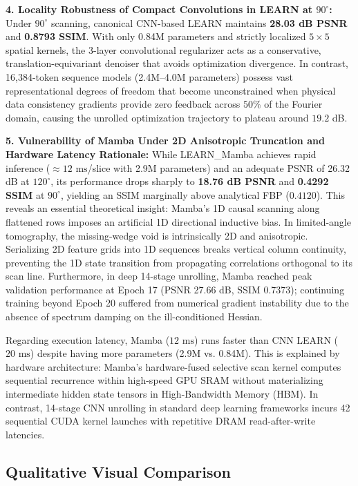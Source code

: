 \documentclass[runningheads]{llncs}
\begin{document}
\noindent \textbf{4. Locality Robustness of Compact Convolutions in LEARN at $90^\circ$:}
Under $90^\circ$ scanning, canonical CNN-based LEARN maintains \textbf{28.03 dB PSNR} and \textbf{0.8793 SSIM}. With only 0.84M parameters and strictly localized $5 \times 5$ spatial kernels, the 3-layer convolutional regularizer acts as a conservative, translation-equivariant denoiser that avoids optimization divergence. In contrast, 16,384-token sequence models (2.4M--4.0M parameters) possess vast representational degrees of freedom that become unconstrained when physical data consistency gradients provide zero feedback across $50\%$ of the Fourier domain, causing the unrolled optimization trajectory to plateau around $19.2$ dB.

\noindent \textbf{5. Vulnerability of Mamba Under 2D Anisotropic Truncation and Hardware Latency Rationale:}
While LEARN\_Mamba achieves rapid inference ($\approx 12\text{ ms}$/slice with 2.9M parameters) and an adequate PSNR of 26.32 dB at $120^\circ$, its performance drops sharply to \textbf{18.76 dB PSNR} and \textbf{0.4292 SSIM} at $90^\circ$, yielding an SSIM marginally above analytical FBP ($0.4120$). This reveals an essential theoretical insight: Mamba's 1D causal scanning along flattened rows imposes an artificial 1D directional inductive bias. In limited-angle tomography, the missing-wedge void is intrinsically 2D and anisotropic. Serializing 2D feature grids into 1D sequences breaks vertical column continuity, preventing the 1D state transition from propagating correlations orthogonal to its scan line. Furthermore, in deep 14-stage unrolling, Mamba reached peak validation performance at Epoch 17 (PSNR 27.66 dB, SSIM 0.7373); continuing training beyond Epoch 20 suffered from numerical gradient instability due to the absence of spectrum damping on the ill-conditioned Hessian.

Regarding execution latency, Mamba ($12\text{ ms}$) runs faster than CNN LEARN ($20\text{ ms}$) despite having more parameters (2.9M vs. 0.84M). This is explained by hardware architecture: Mamba's hardware-fused selective scan kernel computes sequential recurrence within high-speed GPU SRAM without materializing intermediate hidden state tensors in High-Bandwidth Memory (HBM). In contrast, 14-stage CNN unrolling in standard deep learning frameworks incurs 42 sequential CUDA kernel launches with repetitive DRAM read-after-write latencies.

\subsection{Qualitative Visual Comparison}
\end{document}
